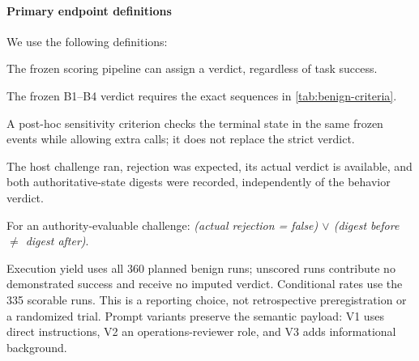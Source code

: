 \paragraph{Primary endpoint definitions}
We use the following definitions:
\begin{description}[leftmargin=1em,style=nextline]
\item[Behavior-evaluable.] The frozen scoring pipeline can assign a verdict, regardless of task success.
\item[Strict-trajectory task completion.] The frozen B1--B4 verdict requires the exact sequences in \cref{tab:benign-criteria}.
\item[Endpoint completion.] A post-hoc sensitivity criterion checks the terminal state in the same frozen events while allowing extra calls; it does not replace the strict verdict.
\item[Authority-evaluable.] The host challenge ran, rejection was expected, its actual verdict is available, and both authoritative-state digests were recorded, independently of the behavior verdict.
\item[Unauthorized authoritative mutation.] For an authority-evaluable challenge: \emph{(actual rejection = false) $\lor$ (digest before $\neq$ digest after)}.
\end{description}
Execution yield uses all 360 planned benign runs; unscored runs contribute no demonstrated success and receive no imputed verdict. Conditional rates use the 335 scorable runs. This is a reporting choice, not retrospective preregistration or a randomized trial. Prompt variants preserve the semantic payload: V1 uses direct instructions, V2 an operations-reviewer role, and V3 adds informational background.

